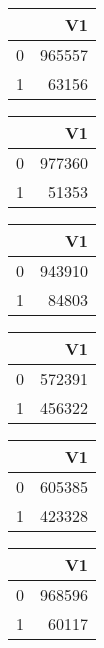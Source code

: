 \bigskip\bigskip
\centering
\begin{tabular}{rr}
  \hline
 & V1 \\ 
  \hline
0 & 965557 \\ 
  1 & 63156 \\ 
   \hline
\end{tabular}

\bigskip\bigskip
\centering
\begin{tabular}{rr}
  \hline
 & V1 \\ 
  \hline
0 & 977360 \\ 
  1 & 51353 \\ 
   \hline
\end{tabular}

\bigskip\bigskip
\centering
\begin{tabular}{rr}
  \hline
 & V1 \\ 
  \hline
0 & 943910 \\ 
  1 & 84803 \\ 
   \hline
\end{tabular}

\bigskip\bigskip
\centering
\begin{tabular}{rr}
  \hline
 & V1 \\ 
  \hline
0 & 572391 \\ 
  1 & 456322 \\ 
   \hline
\end{tabular}

\bigskip\bigskip
\centering
\begin{tabular}{rr}
  \hline
 & V1 \\ 
  \hline
0 & 605385 \\ 
  1 & 423328 \\ 
   \hline
\end{tabular}

\bigskip\bigskip
\centering
\begin{tabular}{rr}
  \hline
 & V1 \\ 
  \hline
0 & 968596 \\ 
  1 & 60117 \\ 
   \hline
\end{tabular}

